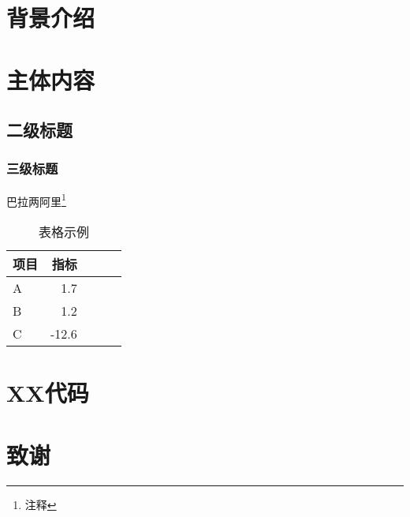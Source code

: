 \documentclass{article}
\begin{document}
    \begin{abstractZH}
        \zhlipsum[1]

    \end{abstractZH}

    \begin{abstractEN}
        \lipsum[1]

    \end{abstractEN}


    \newpage
    \setcounter{page}{1}
    \tableofcontents
    \newpage

    \setcounter{page}{1}
    \section{背景介绍}
    \zhlipsum
    \section{主体内容}

    \subsection{二级标题}
    \subsubsection{三级标题}
    \zhlipsum[2-5]
    巴拉两阿里\footnote{注释}

    \zhlipsum
    
    \begin{table}[htb]
        \caption{表格示例}
        \centering
        \begin{tabular}{lrrrr}
            \toprule
            项目 & 指标 \\
            \midrule
            A &    1.7 \\
            B &    1.2 \\
            C &   -12.6\\
            \bottomrule
        \end{tabular}
    \end{table}

    \appendix
    \section{XX代码}
    \newpage
    \section{致谢}
\end{document}
